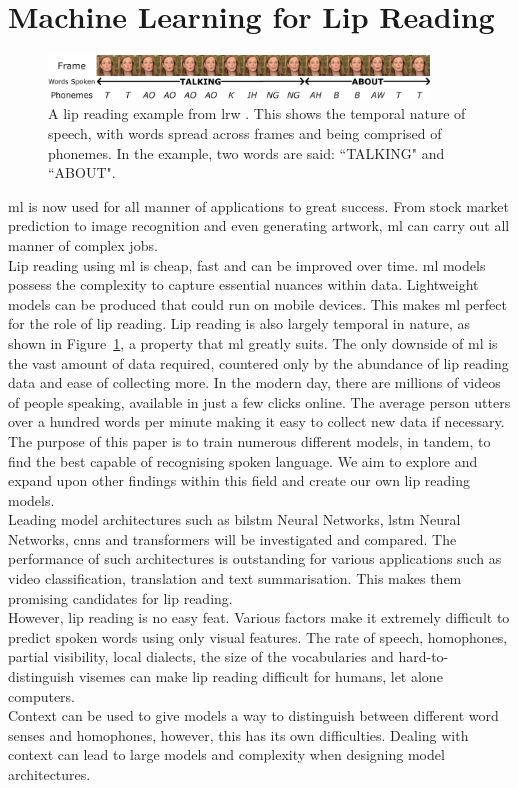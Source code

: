 \section{Machine Learning for Lip Reading}
\begin{figure}
\centering
\includegraphics[width=0.9\textwidth]{resources/LRW Example.png}
\caption[A lip reading example from \gls{lrw}.]{A lip reading example from \gls{lrw} \cite{Lip-Reading-In-The-Wild}. This shows the temporal nature of speech, with words spread across frames and being comprised of \gls{phoneme}s. In the example, two words are said: ``TALKING" and ``ABOUT".}
\label{fig:LRW Example}
\end{figure}
\acrfull{ml} is now used for all manner of applications to great success. From stock market prediction to image recognition and even generating artwork, \acrshort{ml} can carry out all manner of complex jobs.\\
Lip reading using \acrshort{ml} is cheap, fast and can be improved over time. \acrshort{ml} models possess the complexity to capture essential nuances within data. Lightweight models can be produced that could run on mobile devices. This makes \acrshort{ml} perfect for the role of lip reading. Lip reading is also largely temporal in nature, as shown in Figure~\ref{fig:LRW Example}, a property that \acrshort{ml} greatly suits. The only downside of \acrshort{ml} is the vast amount of data required, countered only by the abundance of lip reading data and ease of collecting more. In the modern day, there are millions of videos of people speaking, available in just a few clicks online. The average person utters over a hundred words per minute making it easy to collect new data if necessary.\\
The purpose of this paper is to train numerous different models, in tandem, to find the best capable of recognising spoken language. We aim to explore and expand upon other findings within this field and create our own lip reading models.\\
Leading model architectures such as \acrfull{bilstm} Neural Networks, \acrfull{lstm} Neural Networks, \acrfull{cnns} and \gls{transformer}s will be investigated and compared. The performance of such architectures is outstanding for various applications such as video classification, translation and text summarisation. This makes them promising candidates for lip reading.\\
However, lip reading is no easy feat. Various factors make it extremely difficult to predict spoken words using only visual features. The rate of speech, homophones, partial visibility, local dialects, the size of the vocabularies and hard-to-distinguish \gls{viseme}s can make lip reading difficult for humans, let alone computers.\\
Context can be used to give models a way to distinguish between different word senses and homophones, however, this has its own difficulties. Dealing with context can lead to large models and complexity when designing model architectures.

